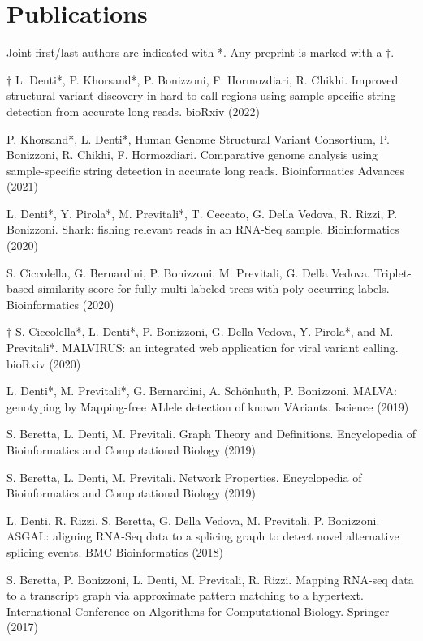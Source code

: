 \documentclass[letterpaper,11pt]{article}
\begin{document}
\section{Publications}
Joint first/last authors are indicated with *. Any preprint is marked with a \(\dagger\).
{\small
\begin{etaremune}
    \item \(\dagger\) L. Denti*, P. Khorsand*, P. Bonizzoni, F. Hormozdiari, R. Chikhi. Improved structural variant discovery in hard-to-call regions using sample-specific string detection from accurate long reads. bioRxiv (2022)

    \item P. Khorsand*, L. Denti*, Human Genome Structural Variant Consortium, P. Bonizzoni, R. Chikhi, F. Hormozdiari. Comparative genome analysis using sample-specific string detection in accurate long reads. Bioinformatics Advances (2021)

    \item L. Denti*, Y. Pirola*, M. Previtali*, T. Ceccato, G. Della Vedova, R. Rizzi, P. Bonizzoni. Shark: fishing relevant reads in an RNA-Seq sample. Bioinformatics (2020)
   
    \item S. Ciccolella, G. Bernardini, P. Bonizzoni, M. Previtali, G. Della Vedova. Triplet-based similarity score for fully multi-labeled trees with poly-occurring labels. Bioinformatics (2020)

    \item \(\dagger\) S. Ciccolella*, L. Denti*, P. Bonizzoni, G. Della Vedova, Y. Pirola*, and M. Previtali*. MALVIRUS: an integrated web application for viral variant calling. bioRxiv (2020)
   
    \item L. Denti*, M. Previtali*, G. Bernardini, A. Sch\"{o}nhuth, P. Bonizzoni. MALVA: genotyping by Mapping-free ALlele detection of known VAriants. Iscience (2019)
   
    \item S. Beretta, L. Denti, M. Previtali. Graph Theory and Definitions. Encyclopedia of Bioinformatics and Computational Biology (2019)
   
    \item S. Beretta, L. Denti, M. Previtali. Network Properties. Encyclopedia of Bioinformatics and Computational Biology (2019)
   
    \item L. Denti, R. Rizzi, S. Beretta, G. Della Vedova, M. Previtali, P. Bonizzoni. ASGAL: aligning RNA-Seq data to a splicing graph to detect novel alternative splicing events. BMC Bioinformatics (2018)
    
    \item S. Beretta, P. Bonizzoni, L. Denti, M. Previtali, R. Rizzi. Mapping RNA-seq data to a transcript graph via approximate pattern matching to a hypertext. International Conference on Algorithms for Computational Biology. Springer (2017)
\end{etaremune}
}
\end{document}
